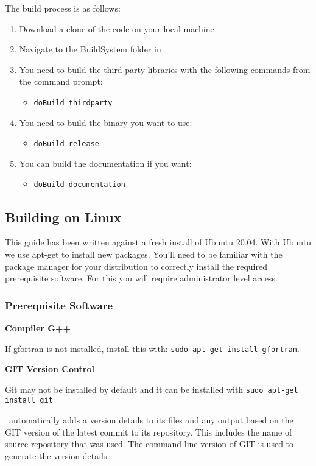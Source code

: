 The build process is as follows: 
\begin{enumerate}
  \item Download a clone of the code on your local machine
  \item Navigate to the BuildSystem folder in 
  \item You need to build the third party libraries with the following commands from the command prompt:
  \begin{itemize}
    \item \texttt{doBuild thirdparty}
  \end{itemize}
  \item You need to build the binary you want to use:
  \begin{itemize}
    \item \texttt{doBuild release}
  \end{itemize}
  \item You can build the documentation if you want:
  \begin{itemize}
    \item \texttt{doBuild documentation}
  \end{itemize}
\end{enumerate}

\subsection{Building on Linux}

This guide has been written against a fresh install of Ubuntu 20.04. With Ubuntu we use apt-get to install new packages. You’ll need to be familiar with the package manager for your distribution to correctly install the required prerequisite software. For this you will require administrator level access.

\subsubsection{Prerequisite Software}

\textbf{Compiler G++}

If gfortran is not installed, install this with: \texttt{sudo apt-get install gfortran}.

\textbf{GIT Version Control}

Git may not be installed by default and it can be installed with \texttt{sudo apt-get install git}

\CNAME\ automatically adds a version details to its files and any output based on the GIT version of the latest commit to its repository. This includes the name of source repository that was used. The command line version of GIT is used  to generate the version details.

